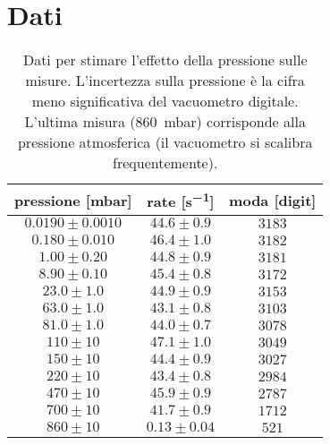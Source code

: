 \section{Dati}

\begin{table}[h]
\centering
\begin{tabular}{c|c|c}

pressione [mbar] & rate [\si{s^{-1}}] & moda [digit] \\
\hline
$ 0.0190 \pm 0.0010 $ & $ 44.6 \pm 0.9 $ & $ 3183 $ \\ 
$ 0.180 \pm 0.010 $ & $ 46.4 \pm 1.0 $ & $ 3182 $ \\ 
$ 1.00 \pm 0.20 $ & $ 44.8 \pm 0.9 $ & $ 3181 $ \\ 
$ 8.90 \pm 0.10 $ & $ 45.4 \pm 0.8 $ & $ 3172 $ \\ 
$ 23.0 \pm 1.0 $ & $ 44.9 \pm 0.9 $ & $ 3153 $ \\ 
$ 63.0 \pm 1.0 $ & $ 43.1 \pm 0.8 $ & $ 3103 $ \\ 
$ 81.0 \pm 1.0 $ & $ 44.0 \pm 0.7 $ & $ 3078 $ \\ 
$ 110 \pm 10 $ & $ 47.1 \pm 1.0 $ & $ 3049 $ \\ 
$ 150 \pm 10 $ & $ 44.4 \pm 0.9 $ & $ 3027 $ \\ 
$ 220 \pm 10 $ & $ 43.4 \pm 0.8 $ & $ 2984 $ \\ 
$ 470 \pm 10 $ & $ 45.9 \pm 0.9 $ & $ 2787 $ \\ 
$ 700 \pm 10 $ & $ 41.7 \pm 0.9 $ & $ 1712 $ \\ 
$ 860 \pm 10 $ & $ 0.13 \pm 0.04 $ & $ 521 $ \\ 

\end{tabular}
\caption{Dati per stimare l'effetto della pressione sulle misure.
L'incertezza sulla pressione è la cifra meno significativa del vacuometro digitale.
L'ultima misura (\SI{860}{mbar}) corrisponde alla pressione atmosferica
(il vacuometro si scalibra frequentemente).}
\label{tab:press}
\end{table}


